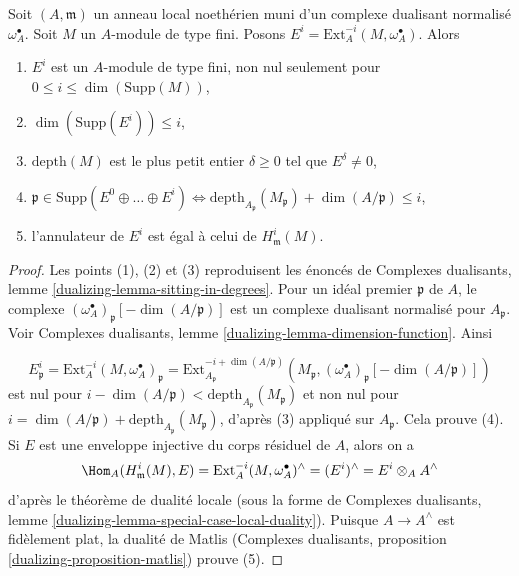 \begin{lemma}
\label{lemma-sitting-in-degrees}
Soit $(A, \mathfrak m)$ un anneau local noethérien muni d'un complexe dualisant normalisé $\omega_A^\bullet$. Soit $M$ un $A$-module de type fini. Posons $E^i = \text{Ext}_A^{-i}(M, \omega_A^\bullet)$. Alors
\begin{enumerate}
\item $E^i$ est un $A$-module de type fini, non nul seulement pour $0 \leq i \leq \dim(\text{Supp}(M))$,
\item $\dim(\text{Supp}(E^i)) \leq i$,
\item $\text{depth}(M)$ est le plus petit entier $\delta \geq 0$ tel que $E^\delta \not = 0$,
\item $\mathfrak p \in \text{Supp}(E^0 \oplus \ldots \oplus E^i)
\Leftrightarrow
\text{depth}_{A_\mathfrak p}(M_\mathfrak p) + \dim(A/\mathfrak p) \leq i$,
\item l'annulateur de $E^i$ est égal à celui de $H^i_\mathfrak m(M)$.
\end{enumerate}
\end{lemma}

\begin{proof}
Les points (1), (2) et (3) reproduisent les énoncés de Complexes dualisants, lemme \ref{dualizing-lemma-sitting-in-degrees}. Pour un idéal premier $\mathfrak p$ de $A$, le complexe $(\omega_A^\bullet)_\mathfrak p[-\dim(A/\mathfrak p)]$ est un complexe dualisant normalisé pour $A_\mathfrak p$. Voir Complexes dualisants, lemme \ref{dualizing-lemma-dimension-function}. Ainsi

$$
E^i_\mathfrak p =
\text{Ext}^{-i}_A(M, \omega_A^\bullet)_\mathfrak p =
\text{Ext}^{-i + \dim(A/\mathfrak p)}_{A_\mathfrak p}
(M_\mathfrak p, (\omega_A^\bullet)_\mathfrak p[-\dim(A/\mathfrak p)])
$$
est nul pour $i - \dim(A/\mathfrak p) < \text{depth}_{A_\mathfrak p}(M_\mathfrak p)$ et non nul pour $i = \dim(A/\mathfrak p) + \text{depth}_{A_\mathfrak p}(M_\mathfrak p)$, d'après (3) appliqué sur $A_\mathfrak p$. Cela prouve (4). Si $E$ est une enveloppe injective du corps résiduel de $A$, alors on a
$$
\Hom_A(H^i_\mathfrak m(M), E) =
\text{Ext}^{-i}_A(M, \omega_A^\bullet)^\wedge =
(E^i)^\wedge =
E^i \otimes_A A^\wedge
$$
d'après le théorème de dualité locale (sous la forme de Complexes dualisants, lemme \ref{dualizing-lemma-special-case-local-duality}). Puisque $A \to A^\wedge$ est fidèlement plat, la dualité de Matlis (Complexes dualisants, proposition \ref{dualizing-proposition-matlis}) prouve (5).
\end{proof}






